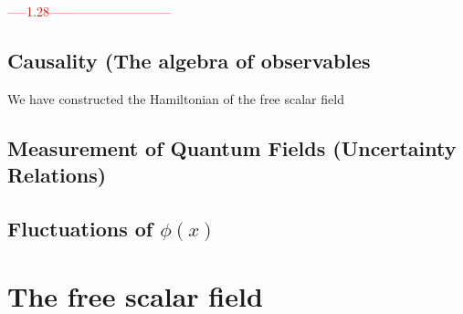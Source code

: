 \documentclass{article}
\begin{document}
\textcolor{red}{-----1.28-----------------------------}
\newline

\subsection{Causality (The algebra of observables}
We have constructed the Hamiltonian of the free scalar field




\subsection{Measurement of Quantum Fields (Uncertainty Relations)}

\subsection{Fluctuations of $\phi(x)$}

\section{The free scalar field}
\end{document}
